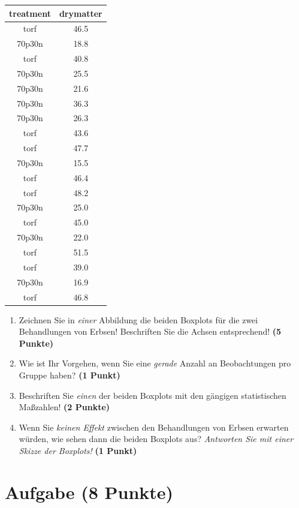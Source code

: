 \documentclass[a4paper, 9pt]{scrartcl}\usepackage[]{graphicx}\usepackage[]{xcolor}
\begin{document}
\begin{table}[!h]
\centering
\begin{tabular}{cc}
\toprule
treatment & drymatter\\
\midrule
torf & 46.5\\
70p30n & 18.8\\
torf & 40.8\\
70p30n & 25.5\\
70p30n & 21.6\\
\addlinespace
70p30n & 36.3\\
70p30n & 26.3\\
torf & 43.6\\
torf & 47.7\\
70p30n & 15.5\\
\addlinespace
torf & 46.4\\
torf & 48.2\\
70p30n & 25.0\\
torf & 45.0\\
70p30n & 22.0\\
\addlinespace
torf & 51.5\\
torf & 39.0\\
70p30n & 16.9\\
torf & 46.8\\
\bottomrule
\end{tabular}
\end{table}



\begin{enumerate}
\item Zeichnen Sie in \textit{einer} Abbildung die beiden Boxplots f{\"u}r die
  zwei Behandlungen von Erbsen! Beschriften Sie die Achsen entsprechend!
  \textbf{(5 Punkte)} 
\item Wie ist Ihr Vorgehen, wenn Sie eine \textit{gerade} Anzahl an
  Beobachtungen pro Gruppe haben? \textbf{(1 Punkt)}
\item Beschriften Sie \textit{einen} der beiden Boxplots mit den g{\"a}ngigen
  statistischen Ma{\ss}zahlen! \textbf{(2 Punkte)}
\item Wenn Sie \textit{keinen Effekt} zwischen den Behandlungen von
  Erbsen erwarten w{\"u}rden, wie sehen dann die beiden Boxplots aus?
  \textit{Antworten Sie mit einer Skizze der Boxplots!}
  \textbf{(1 Punkt)}
\end{enumerate} 
\clearpage

\section{Aufgabe \hfill (8 Punkte)}
\end{document}
